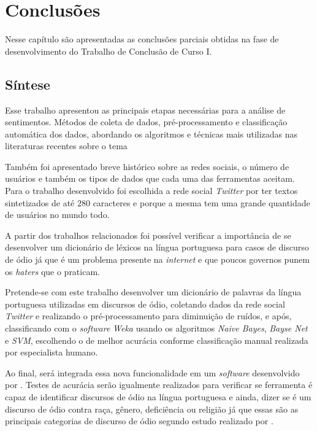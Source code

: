 \chapter{Conclusões}
\label{cap:conclusoes}
Nesse capítulo são apresentadas as conclusões parciais obtidas na fase de desenvolvimento do Trabalho de Conclusão de Curso I.

\section{Síntese}
\label{sec:sintese}

Esse trabalho apresentou as principais etapas necessárias para a análise de sentimentos. Métodos de coleta de dados, pré-processamento e classificação automática dos dados, abordando os algoritmos e técnicas mais utilizadas nas literaturas recentes sobre o tema

Também foi apresentado breve histórico sobre as redes sociais, o número de usuários e também os tipos de dados que cada uma das ferramentas aceitam. Para o trabalho desenvolvido foi escolhida a rede social \textit{Twitter} por ter textos sintetizados de até $280$ caracteres e porque a mesma tem uma grande quantidade de usuários no mundo todo.

A partir dos trabalhos relacionados foi possível verificar a importância de se desenvolver um dicionário de léxicos na língua portuguesa para casos de discurso de ódio já que é um problema presente na \textit{internet} e que poucos governos punem os \textit{haters} que o praticam.

Pretende-se com este trabalho desenvolver um dicionário de palavras da língua portuguesa utilizadas em discursos de ódio, coletando dados da rede social \textit{Twitter} e realizando o pré-processamento para diminuição de ruídos, e após, classificando com o \textit{software} \textit{Weka} usando os algoritmos \textit{Naive Bayes}, \textit{Bayse Net} e \textit{SVM}, escolhendo o de melhor acurácia conforme classificação manual realizada por especialista humano.

Ao final, será integrada essa nova funcionalidade em um \textit{software} desenvolvido por . Testes de acurácia serão igualmente realizados para verificar se ferramenta é capaz de identificar discursos de ódio na língua portuguesa e ainda, dizer se é um discurso de ódio contra raça, gênero, deficiência ou religião já que essas são as principais categorias de discurso de ódio segundo estudo realizado por .

